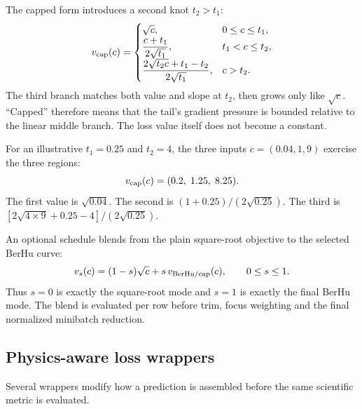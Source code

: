 \documentclass[10pt,aps,prd,twocolumn,nofootinbib]{revtex4-2}
\begin{document}
The capped form introduces a second knot $t_2>t_1$:
\begin{equation*}
 v_{\rm cap}(c)=
 \begin{cases}
   \sqrt{c}, & 0\le c\le t_1,\\
   \dfrac{c+t_1}{2\sqrt{t_1}}, & t_1<c\le t_2,\\
   \dfrac{2\sqrt{t_2c}+t_1-t_2}{2\sqrt{t_1}}, & c>t_2.
 \end{cases}
\end{equation*}
The third branch matches both value and slope at $t_2$, then grows only like
$\sqrt c$.  ``Capped'' therefore means that the tail's gradient pressure is
bounded relative to the linear middle branch.  The loss value itself does not
become a constant.

For an illustrative $t_1=0.25$ and $t_2=4$, the three inputs
$c=(0.04,1,9)$ exercise the three regions:
\begin{equation*}
 v_{\rm cap}(c)=(0.2,\;1.25,\;8.25).
\end{equation*}
The first value is $\sqrt{0.04}$.  The second is
$(1+0.25)/(2\sqrt{0.25})$.  The third is
$[2\sqrt{4\times9}+0.25-4]/(2\sqrt{0.25})$.

An optional schedule blends from the plain square-root objective to the
selected BerHu curve:
\begin{equation*}
 v_s(c)=(1-s)\sqrt c+s\,v_{\rm BerHu/cap}(c),\qquad 0\le s\le1.
\end{equation*}
Thus $s=0$ is exactly the square-root mode and $s=1$ is exactly the final
BerHu mode.  The blend is evaluated per row before trim, focus weighting and
the final normalized minibatch reduction.

\subsection{Physics-aware loss wrappers}

Several wrappers modify how a prediction is assembled before the same
scientific metric is evaluated.
\end{document}
